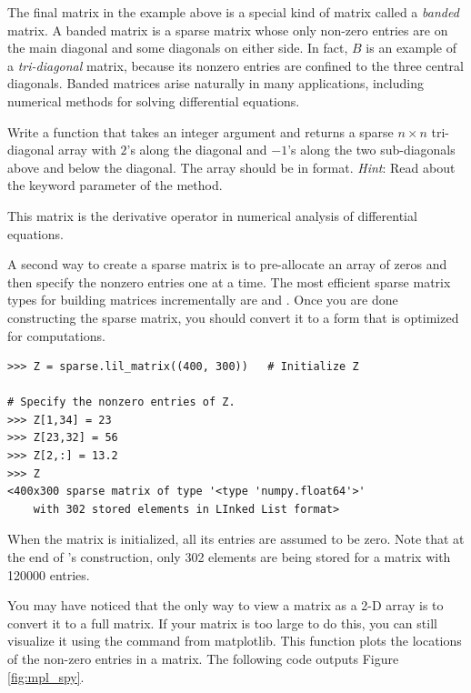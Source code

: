 The final matrix  in the example above is a special kind of matrix called a \emph{banded} matrix. 
A banded matrix is a sparse matrix whose only non-zero entries are on the main diagonal and some diagonals on either side. 
In fact, $B$ is an example of a \emph{tri-diagonal} matrix, because its nonzero entries are confined to the three central diagonals. 
Banded matrices arise naturally in many applications, including numerical methods for solving differential equations. 

\begin{problem}
Write a function that takes an integer argument  and returns a sparse $n\times n$
tri-diagonal array with $2$'s along the diagonal and $-1$'s along
the two sub-diagonals above and below the diagonal. 
The array should be in  format.
\emph{Hint}: Read about the  keyword parameter of the  method.

This matrix is the derivative operator in numerical analysis of differential equations.
\label{prob:sparse_tridiag}
\end{problem}

A second way to create a sparse matrix is to pre-allocate an array of zeros and then specify the nonzero entries one at a time. 
The most efficient sparse matrix types for building matrices incrementally are  and . 
Once you are done constructing the sparse matrix, you should convert it to a form that is optimized for computations.


\begin{lstlisting}
>>> Z = sparse.lil_matrix((400, 300))	# Initialize Z

# Specify the nonzero entries of Z.
>>> Z[1,34] = 23
>>> Z[23,32] = 56
>>> Z[2,:] = 13.2
>>> Z
<400x300 sparse matrix of type '<type 'numpy.float64'>'
	with 302 stored elements in LInked List format>

\end{lstlisting}

When the matrix  is initialized, all its entries are assumed to be zero. 
Note that at the end of 's construction, only 302 elements are being stored for a matrix with 120000 entries. 

You may have noticed that the only way to view a matrix as a 2-D array is to convert it to a full matrix. 
If your matrix is too large to do this, you can still visualize it using the  command from matplotlib. 
This function plots the locations of the non-zero entries in a matrix. 
The following code outputs Figure \ref{fig:mpl_spy}.


